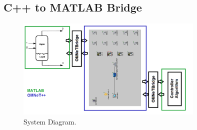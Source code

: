 \subsection{C++ to MATLAB Bridge}
  



\begin{figure}
        \centering
		\includegraphics[width=0.8\textwidth]{figs/system.png}
        \caption{System Diagram.}
        \label{fig:system}        
\end{figure}
